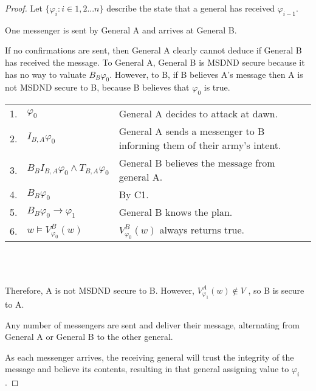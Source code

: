 \begin{proof}
Let $\{ \varphi_i : i \in 1,2 ... n \}$ describe the state that a general has received $\varphi_{i-1}$.

\begin{case}
One messenger is sent by General A and arrives at General B.
\label{case:generalsn0}
\end{case}

If no confirmations are sent, then General A clearly cannot deduce if General B has received the message.
To General A, General B is MSDND secure because it has no way to valuate $B_B \varphi_0$.
However, to B, if B believes A's message then A is not MSDND secure to B, because B believes that $\varphi_0$ is true.

\begin{table}[H]
\centering
\small
\begin{tabularx}{\linewidth}{l l X}
1. & $\varphi_0$ & General A decides to attack at dawn. \\
2. & $I_{B,A} \varphi_0$ & General A sends a messenger to B informing them of their army's intent. \\
3. & $B_{B}I_{B,A} \varphi_0 \wedge T_{B,A} \varphi_0$ & General B believes the message from general A. \\
4. & $B_{B} \varphi_0$ & By C1. \\
5. & $B_{B} \varphi_0 \rightarrow \varphi_1$ & General B knows the plan. \\
6. & $w \vDash V_{\varphi_0}^{B}(w)$ & $V_{\varphi_0}^{B}(w)$ always returns true. \\
\end{tabularx} \\~\\
\label{tab:twoarmiesproof}
\end{table}

Therefore, A is not MSDND secure to B. However, $V_{\varphi_1}^{A}(w) \not \in V$ , so B is secure to A.

\begin{case}
Any number of messengers are sent and deliver their message, alternating from General A or General B to the other general. \label{case:generalsnn}
\end{case}

As each messenger arrives, the receiving general will trust the integrity of the message and believe its contents, resulting in that general assigning value to $\varphi_i$.


\end{proof}
